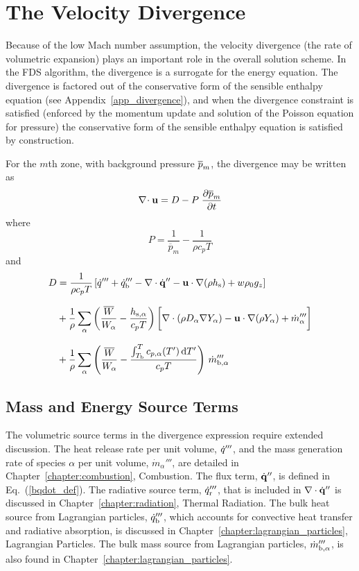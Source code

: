 \section{The Velocity Divergence}

Because of the low Mach number assumption, the velocity divergence (the rate of volumetric expansion) plays an important role in the overall solution scheme.  In the FDS algorithm, the divergence is a surrogate for the energy equation.  The divergence is factored out of the conservative form of the sensible enthalpy equation (see Appendix~\ref{app_divergence}), and when the divergence constraint is satisfied (enforced by the momentum update and solution of the Poisson equation for pressure) the conservative form of the sensible enthalpy equation is satisfied by construction.

For the $m$th zone, with background pressure $\overline{p}_m$, the divergence may be written as
\begin{equation}
\label{eqn_divfromeos}
\nabla\!\cdot {\mathbf{u}} = {D} - {P}\; \frac{\partial \overline{p}_m}{\partial t}
\end{equation}
where
\begin{equation}
\label{eqn_fdsP1}
P = \frac{1}{\overline{p}_m} - \frac{1}{\rho c_p T}
\end{equation}
and
\begin{align}
\label{eqn_fdsD1}
D &= \frac{1}{\rho c_p T}\left[ \dot{q}^{\prime\prime\prime} + \dot{q}_{\rm b}^{\prime\prime\prime} - \nabla\cdot \dot{\mathbf{q}}^{\prime\prime} - \mathbf{u} \cdot\nabla (\rho h_{\rm s}) + w \rho_0 g_z\right] \notag\\[.1in]
&+ \frac{1}{\rho} \sum_\alpha \left(\frac{\overline{W}}{W_\alpha} - \frac{h_{\rm s,\alpha}}{c_p T} \right) \bigg[ \nabla\cdot (\rho D_\alpha \nabla Y_\alpha) - \mathbf{u} \cdot \nabla (\rho Y_\alpha) +\dot{m}_\alpha^{\prime\prime\prime}  \bigg] \notag \\[.1in]
&+ \frac{1}{\rho} \sum_\alpha \left(\frac{\overline{W}}{W_\alpha} - \frac{\int_{T_{\rm b}}^T c_{p,\alpha}(T') \, {\rm d}T'}{c_p T} \right) \, \dot{m}_{\rm b,\alpha}^{\prime\prime\prime}
\end{align}

\subsection{Mass and Energy Source Terms}
\label{div_source_terms}

The volumetric source terms in the divergence expression require extended discussion.  The heat release rate per unit volume, $\dot{q}'''$, and the mass generation rate of species $\alpha$ per unit volume, $\dot{m}_\alpha'''$, are detailed in Chapter~\ref{chapter:combustion}, Combustion. The flux term, $\dot{\mathbf{q}}^{\prime\prime}$, is defined in Eq.~(\ref{bqdot_def}). The radiative source term, $\dot{q}_{\rm r}'''$, that is included in $\nabla \cdot \dot{\mathbf{q}}^{\prime\prime}$ is discussed in Chapter~\ref{chapter:radiation}, Thermal Radiation.  The bulk heat source from Lagrangian particles, $\dot{q}_{\rm b}'''$, which accounts for convective heat transfer and radiative absorption, is discussed in Chapter~\ref{chapter:lagrangian_particles}, Lagrangian Particles.  The bulk mass source from Lagrangian particles, $\dot{m}_{\rm b,\alpha}'''$, is also found in Chapter~\ref{chapter:lagrangian_particles}.

